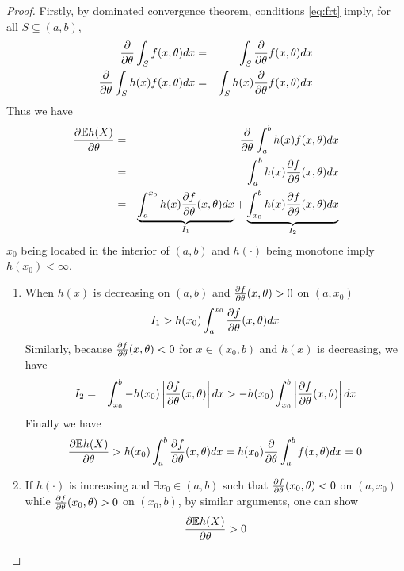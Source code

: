 \begin{subappendices}
\begin{proof}
  Firstly, by dominated convergence theorem, conditions \eqref{eq:frt}
  imply, for all $S \subseteq (a, b)$,
  \begin{eqnarray*}
    {\partial\over \partial\theta}\int_S f(x, \theta) dx
    &=&
    \int_S {\partial \over \partial \theta} f(x, \theta) dx \\
    {\partial \over \partial \theta}\int_S h(x) f(x, \theta) dx
    &=&
    \int_S h(x) {\partial \over \partial \theta} f(x, \theta) dx \\
  \end{eqnarray*}
  Thus we have
  \begin{eqnarray*}
    {\partial \mathbb{E} h(X) \over \partial\theta}
    &=&
    {\partial \over \partial \theta}
    \int_a^b h(x)
    f(x, \theta) dx \\
    &=& \int_a^b h(x)
    {\partial f \over \partial \theta}(x, \theta) dx \\
    &=& \underbrace{\int_a^{x_0}
      h(x) {\partial f \over \partial \theta}(x, \theta) dx}_{I_1}
    + \underbrace{\int_{x_0}^b
      h(x) {\partial f \over \partial \theta}(x,
      \theta) dx}_{I_2}
  \end{eqnarray*}
  $x_0$ being located in the interior of $(a, b)$ and
  $h(\cdot)$ being monotone imply $h(x_0) < \infty$.
  \begin{enumerate}
  \item When $h(x)$ is decreasing on $(a, b)$ and ${\partial f \over \partial
    \theta}(x, \theta) > 0$ on $(a, x_0)$
    \[
    I_1 > h(x_0) \int_a^{x_0}
    {\partial f \over \partial \theta}(x, \theta) dx
    \]
    Similarly, because ${\partial f \over \partial \theta}(x, \theta) < 0$ for
    $x \in (x_0, b)$ and $h(x)$ is decreasing, we have
    \begin{eqnarray*}
      I_2 &=& \int_{x_0}^b -h(x_0)
      \left|{\partial f \over \partial \theta}(x, \theta) \right| dx
      > -h(x_0)
      \int_{x_0}^b \left| 
        {\partial f \over \partial \theta}(x, \theta)
      \right| dx
    \end{eqnarray*}
    Finally we have
    \begin{eqnarray*}
      {\partial \mathbb{E} h(X) \over \partial\theta}
      > h(x_0) \int_a^b
      {\partial f \over \partial \theta}(x, \theta) dx
      = h(x_0) {\partial \over \partial \theta}
      \int_a^b f(x, \theta) dx
      = 0
    \end{eqnarray*}
  \item If $h(\cdot)$ is increasing and $\exists x_0 \in (a, b)$ such that 
    ${\partial f \over \partial \theta}(x_0, \theta) < 0$ on $(a, x_0)$  while
    ${\partial f \over \partial \theta}(x_0, \theta) > 0$ on $(x_0, b)$, 
    by similar arguments, one can show
    \[
    {\partial \mathbb{E} h(X) \over \partial \theta}> 0
    \]
\end{enumerate}
\end{proof}


\end{subappendices}
